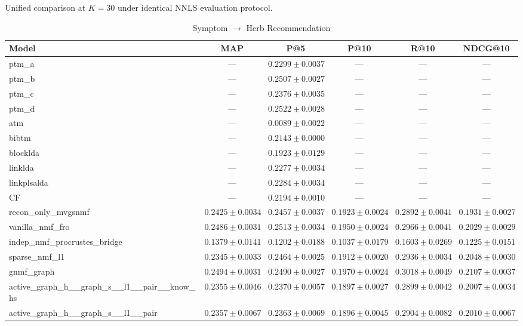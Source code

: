 \begin{table}[htbp]
\centering
\caption{Unified comparison at $K=30$ under identical NNLS evaluation protocol.}
\label{tab:unified}
\small
\begin{subtable}{\textwidth}
\centering
\caption{Symptom $\to$ Herb Recommendation}
\begin{tabular}{lccccc}
\toprule
Model & MAP & P@5 & P@10 & R@10 & NDCG@10 \\
\midrule
ptm\_a & --- & $0.2299\pm0.0037$ & --- & --- & --- \\
ptm\_b & --- & $0.2507\pm0.0027$ & --- & --- & --- \\
ptm\_c & --- & $0.2376\pm0.0035$ & --- & --- & --- \\
ptm\_d & --- & $0.2522\pm0.0028$ & --- & --- & --- \\
atm & --- & $0.0089\pm0.0022$ & --- & --- & --- \\
bibtm & --- & $0.2143\pm0.0000$ & --- & --- & --- \\
blocklda & --- & $0.1923\pm0.0129$ & --- & --- & --- \\
linklda & --- & $0.2277\pm0.0034$ & --- & --- & --- \\
linkplsalda & --- & $0.2284\pm0.0034$ & --- & --- & --- \\
CF & --- & $0.2194\pm0.0010$ & --- & --- & --- \\
recon\_only\_mvgsnmf & $0.2425\pm0.0034$ & $0.2457\pm0.0037$ & $0.1923\pm0.0024$ & $0.2892\pm0.0041$ & $0.1931\pm0.0027$ \\
vanilla\_nmf\_fro & $0.2486\pm0.0031$ & $0.2513\pm0.0034$ & $0.1950\pm0.0024$ & $0.2966\pm0.0041$ & $0.2029\pm0.0029$ \\
indep\_nmf\_procrustes\_bridge & $0.1379\pm0.0141$ & $0.1202\pm0.0188$ & $0.1037\pm0.0179$ & $0.1603\pm0.0269$ & $0.1225\pm0.0151$ \\
sparse\_nmf\_l1 & $0.2345\pm0.0033$ & $0.2464\pm0.0025$ & $0.1912\pm0.0020$ & $0.2936\pm0.0034$ & $0.2048\pm0.0030$ \\
gnmf\_graph & $0.2494\pm0.0031$ & $0.2490\pm0.0027$ & $0.1970\pm0.0024$ & $0.3018\pm0.0049$ & $0.2107\pm0.0037$ \\
active\_graph\_h\_\_graph\_s\_\_l1\_\_pair\_\_know\_hs & $0.2355\pm0.0046$ & $0.2370\pm0.0057$ & $0.1897\pm0.0027$ & $0.2899\pm0.0042$ & $0.2007\pm0.0034$ \\
active\_graph\_h\_\_graph\_s\_\_l1\_\_pair & $0.2357\pm0.0067$ & $0.2363\pm0.0069$ & $0.1896\pm0.0045$ & $0.2904\pm0.0082$ & $0.2010\pm0.0067$ \\

\end{tabular}
\end{subtable}
\end{table}
